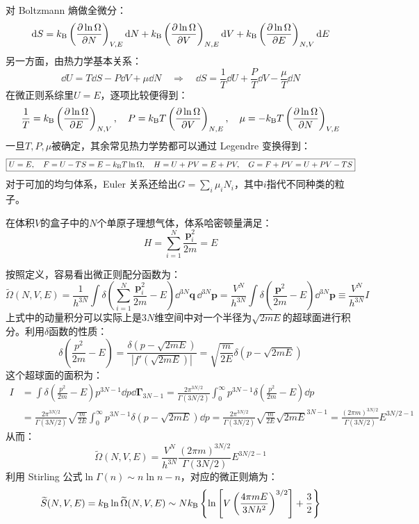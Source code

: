 对 Boltzmann 熵做全微分：
\[\dd S=k_{\rm B}\left(\pdv{\ln\Omega}{N}\right)_{V,E}\dd N+k_{\rm B}\left(\pdv{\ln\Omega}{V}\right)_{N,E}\dd V+k_{\rm B}\left(\pdv{\ln\Omega}{E}\right)_{N,V}\dd E\]
另一方面，由热力学基本关系：
\[\dd U=T\dd S-P\dd V+\mu \dd N \quad \Rightarrow \quad \dd S=\frac{1}{T}\dd U+\frac{P}{T}\dd V-\frac{\mu}{T}\dd N\]
在微正则系综里$U=E$，逐项比较便得到：
\begin{equation}\label{eq:nve_terms}
\frac{1}{T}=k_{\rm B}\left(\pdv{\ln\Omega}{E}\right)_{N,V}, \quad P=k_{\rm B} T\left(\pdv{\ln\Omega}{V}\right)_{N,E}, \quad \mu=-k_{\rm B} T\left(\pdv{\ln\Omega}{N}\right)_{V,E}
\end{equation}
一旦$T,P,\mu$被确定，其余常见热力学势都可以通过 Legendre 变换得到：
\begin{equation}\label{eq:Legendre_4}
\boxed{U=E,\quad F=U-TS=E-k_{\rm B} T\ln\Omega, \quad H=U+PV=E+PV, \quad G=F+PV=U+PV-TS}
\end{equation}
对于可加的均匀体系，Euler 关系还给出$G=\sum_i\mu_i N_i$，其中$i$指代不同种类的粒子。
\begin{proposition}[微正则系综下的单原子理想气体]
在体积$V$的盒子中的$N$个单原子理想气体，体系哈密顿量满足：
\[H=\sum_{i=1}^{N}\frac{\bm{p}_i^2}{2m}=E\]
\end{proposition}
按照定义，容易看出微正则配分函数为：
\[\widetilde{\Omega}(N,V,E)=\frac{1}{h^{3N}}\int \delta\!\left(\sum_{i=1}^{N}\frac{\bm{p}_i^2}{2m}-E\right)\dd^{3N}\bm{q}\,\dd^{3N}\bm{p}=\frac{V^N}{h^{3N}}\int \delta\!\left(\frac{\bm{p}^2}{2m}-E\right)\dd^{3N}\bm{p}\equiv \frac{V^N}{h^{3N}}I\]
上式中的动量积分可以实际上是$3N$维空间中对一个半径为$\sqrt{2mE}$的超球面进行积分。利用$\delta$函数的性质：
\[\delta\!\left(\frac{p^2}{2m}-E\right)=\frac{\delta(p-\sqrt{2mE})}{|f'(\sqrt{2mE})|}=\sqrt{\frac{m}{2E}}\delta(p-\sqrt{2mE})\]
这个超球面的面积为：
\[\begin{aligned}
I&=\int\delta\!\left(\frac{p^2}{2m}-E\right)p^{3N-1}\dd p\dd{\bm{\Gamma}_{3N-1}}=\frac{2\pi^{3N/2}}{\Gamma(3N/2)}\int_0^\infty p^{3N-1}\delta\!\left(\frac{p^2}{2m}-E\right)\dd p\\
&=\frac{2\pi^{3N/2}}{\Gamma(3N/2)}\sqrt{\frac{m}{2E}}\int_0^\infty p^{3N-1}\delta(p-\sqrt{2mE})\dd p=\frac{2\pi^{3N/2}}{\Gamma(3N/2)}\sqrt{\frac{m}{2E}}\sqrt{2mE}^{3N-1}=\frac{(2\pi m)^{3N/2}}{\Gamma(3N/2)}E^{3N/2-1}
\end{aligned}\]
从而：
\[\widetilde{\Omega}(N,V,E)=\frac{V^N}{h^{3N}}\frac{(2\pi m)^{3N/2}}{\Gamma(3N/2)}E^{3N/2-1}\]
利用 Stirling 公式$\ln\Gamma(n)\sim n\ln n-n$，对应的微正则熵为：
\[\widetilde{S}(N,V,E)=k_{\rm B}\ln \widetilde{\Omega}(N,V,E)\sim Nk_{\rm B}\left\{\ln\left[V\left(\frac{4\pi mE}{3Nh^2}\right)^{3/2}\right]+\frac{3}{2}\right\}\]
